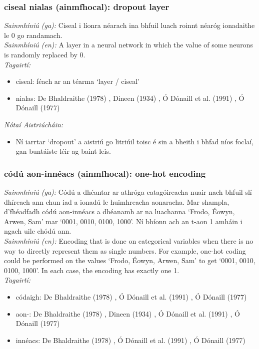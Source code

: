 \subsubsection*{ciseal nialas (ainmfhocal): dropout layer}
 \noindent \textit{Sainmhíniú (ga):} Ciseal i líonra néarach ina bhfuil luach roinnt néaróg ionadaithe le 0 go randamach.
\\
 \noindent \textit{Sainmhíniú (en):} A layer in a neural network in which the value of some neurons is randomly replaced by 0.
\\
 \noindent \textit{Tagairtí:}
\begin{itemize}
	\item ciseal: féach ar an téarma `layer / ciseal'
	\item nialas: De Bhaldraithe (1978) \cite{de-bhaldraithe}, Dineen (1934) \cite{dineen}, Ó Dónaill et al. (1991) \cite{focloir-beag}, Ó Dónaill (1977) \cite{odonaill}
\end{itemize}

 \noindent \textit{Nótaí Aistriúcháin:}
\begin{itemize}
	\item Ní iarrtar `dropout' a aistriú go litriúil toisc é sin a bheith i bhfad níos foclaí, gan buntáiste léir ag baint leis.
\end{itemize}


\subsubsection*{códú aon-innéacs (ainmfhocal): one-hot encoding}
 \noindent \textit{Sainmhíniú (ga):} Códú a dhéantar ar athróga catagóireacha nuair nach bhfuil slí dhíreach ann chun iad a ionadú le huimhreacha aonaracha. Mar shampla, d'fhéadfadh códú aon-innéacs a dhéanamh ar na luachanna `Frodo, Éowyn, Arwen, Sam' mar `0001, 0010, 0100, 1000'. Ní bhíonn ach an t-aon 1 amháin i ngach uile chódú ann.
\\
 \noindent \textit{Sainmhíniú (en):} Encoding that is done on categorical variables when there is no way to directly represent them as single numbers. For example, one-hot coding could be performed on the values `Frodo, Éowyn, Arwen, Sam' to get `0001, 0010, 0100, 1000'. In each case, the encoding has exactly one 1.
\\
 \noindent \textit{Tagairtí:}
\begin{itemize}
	\item códaigh: De Bhaldraithe (1978) \cite{de-bhaldraithe}, Ó Dónaill et al. (1991) \cite{focloir-beag}, Ó Dónaill (1977) \cite{odonaill}
	\item aon-: De Bhaldraithe (1978) \cite{de-bhaldraithe}, Dineen (1934) \cite{dineen}, Ó Dónaill et al. (1991) \cite{focloir-beag}, Ó Dónaill (1977) \cite{odonaill}
	\item innéacs: De Bhaldraithe (1978) \cite{de-bhaldraithe}, Ó Dónaill et al. (1991) \cite{focloir-beag}, Ó Dónaill (1977) \cite{odonaill}
\end{itemize}

